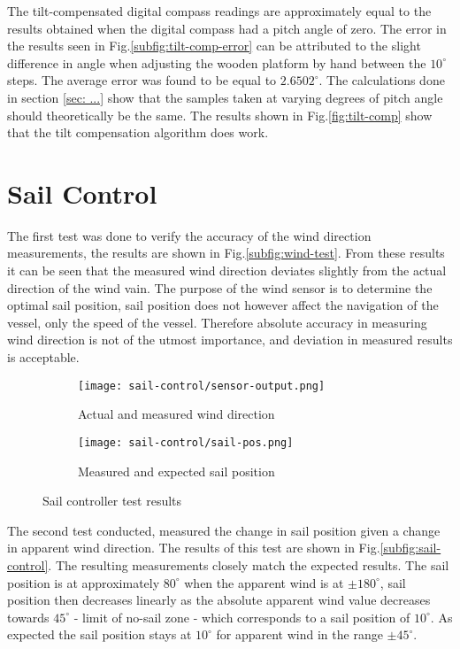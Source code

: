 The tilt-compensated digital compass readings are approximately equal to the results obtained when the digital compass had a pitch angle of zero. The error in the results seen in Fig.\ref{subfig:tilt-comp-error}
can be attributed to the slight difference in angle when adjusting the wooden platform by hand between the $10^{\circ}$ steps. The average error was found to be equal to $2.6502^{\circ}$. The calculations done
in section \ref{sec: ...} show that the samples taken at varying degrees of pitch angle should theoretically be the same. The results shown in Fig.\ref{fig:tilt-comp} show that the tilt compensation 
algorithm does work.

\section{Sail Control}
\label{sail-control}

The first test was done to verify the accuracy of the wind direction measurements, the results are shown in Fig.\ref{subfig:wind-test}. From these results it can be seen that the measured wind 
direction deviates slightly from the actual direction of the wind vain. The purpose of the wind sensor is to determine the optimal sail position, sail position does not however affect the navigation
of the vessel, only the speed of the vessel. Therefore absolute accuracy in measuring wind direction is not of the utmost importance, and deviation in measured results is acceptable.

\begin{figure}
    \centering
    \begin{subfigure}[h!]{0.49\textwidth}
      \texttt{[image: sail-control/sensor-output.png]}
      \caption{Actual and measured wind direction}
      \label{fig:wind-test}
    \end{subfigure}
    \begin{subfigure}[h!]{0.49\textwidth}
      \texttt{[image: sail-control/sail-pos.png]}
      \caption{Measured and expected sail position}
      \label{fig:sail-pos-test}
    \end{subfigure}
    \caption[Sail controller test results]{Sail controller test results}
    \label{fig:sail-control}
\end{figure}

The second test conducted, measured the change in sail position given a change in apparent wind direction. The 
results of this test are shown in Fig.\ref{subfig:sail-control}. The resulting measurements closely match the expected results. The sail position is at approximately $80^{\circ}$ when the apparent 
wind is at $\pm 180^{\circ}$, sail position then decreases linearly as the absolute apparent wind value decreases towards $45^{\circ}$ - limit of no-sail zone - which corresponds to a sail position 
of $10^{\circ}$. As expected the sail position stays at $10^{\circ}$ for apparent wind in the range $\pm 45^{\circ}$. 


